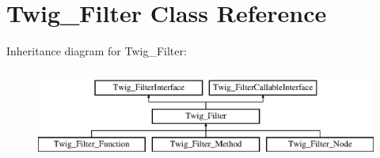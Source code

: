 \hypertarget{classTwig__Filter}{}\section{Twig\+\_\+\+Filter Class Reference}
\label{classTwig__Filter}
Inheritance diagram for Twig\+\_\+\+Filter\+:\begin{figure}[H]
\begin{center}
\leavevmode
\includegraphics[height=3.000000cm]{classTwig__Filter}
\end{center}
\end{figure}
